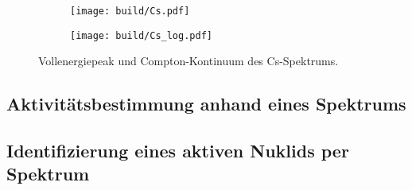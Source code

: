 \begin{figure}
  \begin{subfigure}{0.49\textwidth}
    \centering
    \texttt{[image: build/Cs.pdf]}
  \end{subfigure}
  \begin{subfigure}{0.49\textwidth}
    \centering
    \texttt{[image: build/Cs\_log.pdf]}
  \end{subfigure}
  \caption{Vollenergiepeak und Compton-Kontinuum des Cs-Spektrums.}
  \label{plt:Cs_abs}
\end{figure}

\subsection{Aktivitätsbestimmung anhand eines Spektrums}
\label{sec:Aktivitätsbestimmung}

\subsection{Identifizierung eines aktiven Nuklids per Spektrum}
\label{sec:Nuklidbestimmung}

